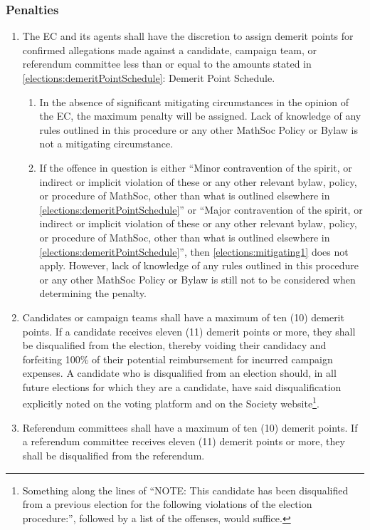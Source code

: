 \subsubsection{Penalties}
		\begin{enumerate}
			\item The EC and its agents shall have the discretion to assign demerit points for confirmed allegations made against a candidate, campaign team, or referendum committee less than or equal to the amounts stated in \cref{elections:demeritPointSchedule}: Demerit Point Schedule.
				\begin{enumerate}
					\item \label{elections:mitigating1} In the absence of significant mitigating circumstances in the opinion of the EC, the maximum penalty will be assigned. Lack of knowledge of any rules outlined in this procedure or any other MathSoc Policy or Bylaw is not a mitigating circumstance.
					\item If the offence in question is either ``Minor contravention of the spirit, or indirect or implicit violation of these or any other relevant bylaw, policy, or procedure of MathSoc, other than what is outlined elsewhere in \cref{elections:demeritPointSchedule}'' or ``Major contravention of the spirit, or indirect or implicit violation of these or any other relevant bylaw, policy, or procedure of MathSoc, other than what is outlined elsewhere in \cref{elections:demeritPointSchedule}'', then \cref{elections:mitigating1} does not apply. However, lack of knowledge of any rules outlined in this procedure or any other MathSoc Policy or Bylaw is still not to be considered when determining the penalty.
				\end{enumerate}
			\item Candidates or campaign teams shall have a maximum of ten (10) demerit points. If a candidate receives eleven (11) demerit points or more, they shall be disqualified from the election, thereby voiding their candidacy and forfeiting 100\% of their potential reimbursement for incurred campaign expenses. A candidate who is disqualified from an election should, in all future elections for which they are a candidate, have said disqualification explicitly noted on the voting platform and on the Society website\footnote{Something along the lines of ``NOTE: This candidate has been disqualified from a previous election for the following violations of the election procedure:'', followed by a list of the offenses, would suffice.}.
			\item \label{elections:referendumCommitteeDisqualification} Referendum committees shall have a maximum of ten (10) demerit points. If a referendum committee receives eleven (11) demerit points or more, they shall be disqualified from the referendum.

\end{enumerate}
